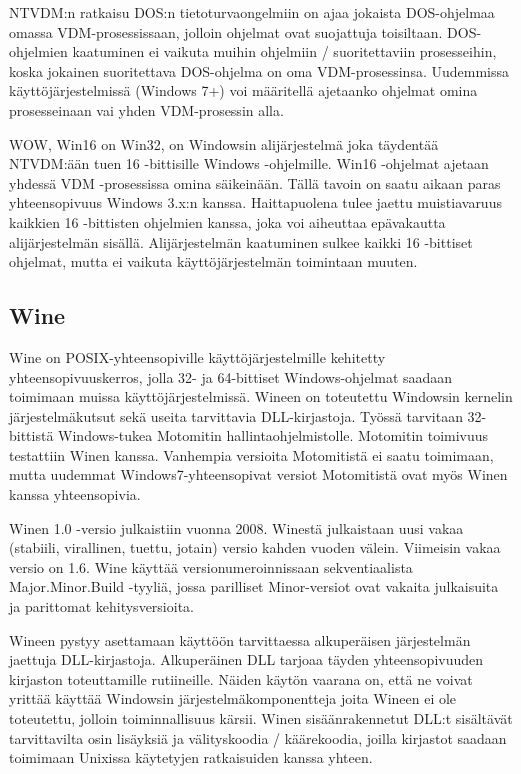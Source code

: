 NTVDM:n ratkaisu DOS:n tietoturvaongelmiin on ajaa jokaista DOS-ohjelmaa omassa VDM-prosessissaan, jolloin ohjelmat ovat suojattuja toisiltaan. DOS-ohjelmien kaatuminen ei vaikuta muihin ohjelmiin / suoritettaviin prosesseihin, koska jokainen suoritettava DOS-ohjelma on oma VDM-prosessinsa. Uudemmissa käyttöjärjestelmissä (Windows 7+) voi määritellä ajetaanko ohjelmat omina prosesseinaan vai yhden VDM-prosessin alla.

WOW, Win16 on Win32, on Windowsin alijärjestelmä joka täydentää NTVDM:ään tuen 16 -bittisille Windows -ohjelmille. Win16 -ohjelmat ajetaan yhdessä VDM -prosessissa omina säikeinään. Tällä tavoin on saatu aikaan paras yhteensopivuus Windows 3.x:n kanssa. Haittapuolena tulee jaettu muistiavaruus kaikkien 16 -bittisten ohjelmien kanssa, joka voi aiheuttaa epävakautta alijärjestelmän sisällä. Alijärjestelmän kaatuminen sulkee kaikki 16 -bittiset ohjelmat, mutta ei vaikuta käyttöjärjestelmän toimintaan muuten. \cite{ntvdm_kb}


\subsection{Wine}
Wine on POSIX-yhteensopiville käyttöjärjestelmille kehitetty yhteensopivuuskerros, jolla 32- ja 64-bittiset Windows-ohjelmat saadaan toimimaan muissa käyttöjärjestelmissä. Wineen on toteutettu Windowsin kernelin järjestelmäkutsut sekä useita tarvittavia DLL-kirjastoja. Työssä tarvitaan 32-bittistä Windows-tukea Motomitin hallintaohjelmistolle. Motomitin toimivuus testattiin Winen kanssa. Vanhempia versioita Motomitistä ei saatu toimimaan, mutta uudemmat Windows7-yhteensopivat versiot Motomitistä ovat myös Winen kanssa yhteensopivia.

Winen 1.0 -versio julkaistiin vuonna 2008. Winestä julkaistaan uusi vakaa (stabiili, virallinen, tuettu, jotain) versio kahden vuoden välein. Viimeisin vakaa versio on 1.6. Wine käyttää versionumeroinnissaan sekventiaalista Major.Minor.Build -tyyliä, jossa parilliset Minor-versiot ovat vakaita julkaisuita ja parittomat kehitysversioita.

Wineen pystyy asettamaan käyttöön tarvittaessa alkuperäisen järjestelmän jaettuja DLL-kirjastoja. Alkuperäinen DLL tarjoaa täyden yhteensopivuuden kirjaston toteuttamille rutiineille. Näiden käytön vaarana on, että ne voivat yrittää käyttää Windowsin järjestelmäkomponentteja joita Wineen ei ole toteutettu, jolloin toiminnallisuus kärsii. Winen sisäänrakennetut DLL:t sisältävät tarvittavilta osin lisäyksiä ja välityskoodia / käärekoodia, joilla kirjastot saadaan toimimaan Unixissa käytetyjen ratkaisuiden kanssa yhteen.

